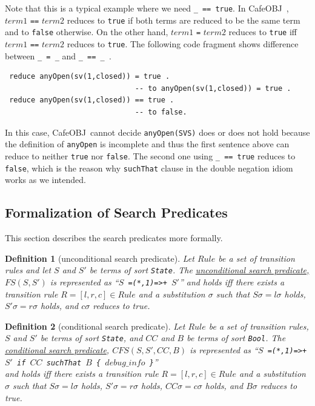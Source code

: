 \documentclass[12pt]{report}
\newtheorem{definition}{Definition}
\newcommand{\stt}[1]{{\small{\tt {#1}}}}
\newcommand{\ul}{\underline}
\newcommand{\cafeobj}{{\sf CafeOBJ}~}
\begin{document}
Note that this is a typical example where we need \stt{\_ == true}. In
\cafeobj, $term1$ {\tt ==} $term2$ reduces to {\tt true} if both terms
are reduced to be the same term and to {\tt false} otherwise. On the
other hand, $term1$ {\tt =} $term2$ reduces to {\tt true} iff $term1$
{\tt ==} $term2$ reduces to {\tt true}. The following code fragment
shows difference between \stt{\_ = \_} and \stt{\_ == \_ }.
\begin{verbatim}
 reduce anyOpen(sv(1,closed)) = true .
                              -- to anyOpen(sv(1,closed)) = true .
 reduce anyOpen(sv(1,closed)) == true . 
                              -- to false.
\end{verbatim}
In this case, \cafeobj cannot decide \stt{anyOpen(SVS)} does or does
not hold because the definition of {\tt anyOpen} is incomplete and
thus the first sentence above can reduce to neither {\tt true} nor
{\tt false}.  The second one using \stt{\_ == true} reduces to
{\tt false}, which is the reason why {\tt suchThat} clause in the
double negation idiom works as we intended.

\subsection{Formalization of Search Predicates}
\label{sec:formalSeach}
This section describes the search predicates more formally.  
\begin{definition}[unconditional search predicate]
  Let $Rule$ be a set of transition rules and let $S$ and $S'$ be
  terms of sort {\tt State}. The \ul{unconditional search predicate,
    $FS(S,S')$} is represented as ``\stt{$S$ =(*,1)=>+ $S'$}''
  and holds iff there exists a transition rule $R=[l,r,c]\in Rule$ and
  a substitution $\sigma$ such that $S\sigma=l\sigma$ holds,
  $S'\sigma=r\sigma$ holds, and $c\sigma$ reduces to true.
\end{definition}
\begin{definition}[conditional search predicate]
  Let $Rule$ be a set of transition rules, $S$ and $S'$ be terms of
  sort {\tt State}, and $CC$ and $B$ be terms of sort {\tt Bool}. The
  \ul{conditional search predicate}, \ul{$CFS(S,S',CC,B)$} is
  represented as ``\stt{$S$ =(*,1)=>+ $S'$ if $CC$ suchThat $B$ \{
    $debug\_info$ \}}''\\ and holds iff there exists a transition
  rule $R=[l,r,c]\in Rule$ and a substitution $\sigma$ such that
  $S\sigma=l\sigma$ holds, $S'\sigma=r\sigma$ holds,
  $CC\sigma=c\sigma$ holds, and $B\sigma$ reduces to true.
\end{definition}
\end{document}
